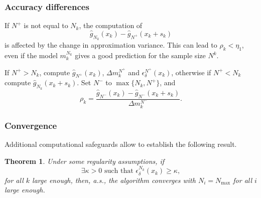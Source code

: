 \documentclass[aspectratio=169]{beamer}
\newtheorem{theo}{Theorem}
\begin{document}
\begin{frame}
\frametitle{Accuracy differences}

If $N^+$ is not equal to $N_k$, the computation of
\[
 \hat{g}_{N_k} (x_k) - \hat{g}_{N^+} ( x_k + s_k )
\]
is affected by the change in approximation variance.
This can lead to $\rho_k < \eta_1$, even if the model $m_k^{N_k}$ gives a good prediction for the sample size $N^k$.



\mbox{}

If $N^+ > N_k$, compute $\hat{g}_{N^+}(x_k)$, $\Delta m_k^{N^+}$ and
$\epsilon_{\delta}^{N^+}(x_k)$, otherwise if $N^+ < N_k$ compute $\hat{g}_{N_k}(x_k + s_k)$.
Set $N^-$ to $\max\lbrace N_k, N^+ \rbrace$, and %
\[
\rho_k = \frac{\hat{g}_{N^-}(x_k) - \hat{g}_{N^-}(x_k+s_k)}{\Delta
m_k^{N^-}}.
\]

\end{frame}






\begin{frame}
\frametitle{Convergence}

Additional computational safeguards allow to establish the following result.

\begin{theo}
Under some regularity assumptions, if
\[
\exists \kappa > 0\text{ such that }
\epsilon_{\delta}^{N_k}(x_k) \geq \kappa,
\]
for all $k$ large enough, then, a.s., the algorithm converges 
with $N_i = N_{\max}$ for all $i$ large enough.
\end{theo}

\end{frame}
\end{document}
